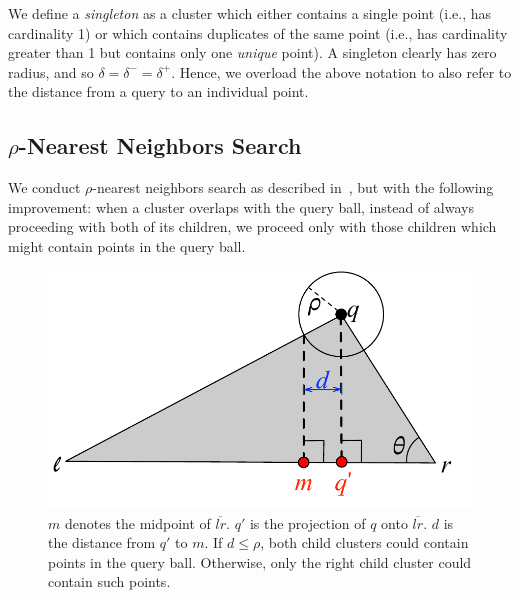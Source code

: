 We define a \emph{singleton} as a cluster which either contains a single point (i.e., has cardinality 1) or which contains duplicates of the same point (i.e., has cardinality greater than 1 but contains only one \emph{unique} point).
A singleton clearly has zero radius, and so $\delta = \delta^{-} = \delta^{+}$.
Hence, we overload the above notation to also refer to the distance from a query to an individual point.


\subsection{\texorpdfstring{$\rho$}{p}-Nearest Neighbors Search}
\label{subsec:methods:rnn-search}

We conduct $\rho$-nearest neighbors search as described in~\cite{ishaq2019clustered}, but with the following improvement:
when a cluster overlaps with the query ball, instead of always proceeding with both of its children, we proceed only with those children which might contain points in the query ball.

\begin{figure}[ht!]
    \centering
    \includegraphics[scale=0.5]{images/geometry/overlapping-children-3.pdf}
    \caption{
        $m$ denotes the midpoint of $\overline{l r}$. $q'$ is the projection of $q$ onto $\overline{l r}$.
        $d$ is the distance from $q'$ to $m$.
        If $d \leq \rho$, both child clusters could contain points in the query ball.
        Otherwise, only the right child cluster could contain such points. 
    }
    \label{fig:methods:overlapping-children-3}
\end{figure}

